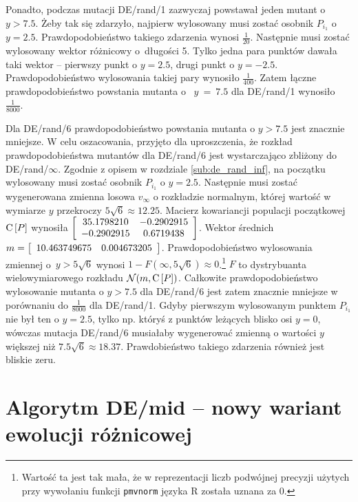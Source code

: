 \documentclass[a4paper,onecolumn,oneside,12pt,wide,floatssmall]{mwrep}
\def\C{{\rm C}\,}
\theoremstyle{definition}
\theoremstyle{plain}%
\theoremstyle{remark}
\begin{document}
Ponadto, podczas mutacji DE/rand/1 zazwyczaj powstawał jeden mutant o $y > 7.5$. 
Żeby tak się zdarzyło, najpierw wylosowany musi zostać osobnik $P_{i_1}$ o~$y=2.5$.
Prawdopodobieństwo takiego zdarzenia wynosi $\frac{1}{20}$.
Następnie musi zostać wylosowany wektor różnicowy o~długości 5. Tylko jedna para punktów 
dawała taki wektor --
pierwszy punkt o $y = 2.5$, drugi punkt o $y = -2.5$. 
Prawdopodobieństwo wylosowania takiej pary wynosiło $\frac{1}{400}$. 
Zatem łączne prawdopodobieństwo powstania mutanta o~
$y~=~7.5$ dla DE/rand/1 wynosiło $\frac{1}{8000}$. 

Dla DE/rand/6 prawdopodobieństwo powstania mutanta o $y > 7.5$ jest znacznie mniejsze.
W celu oszacowania, przyjęto dla uproszczenia, że rozkład prawdopodobieństwa mutantów dla
DE/rand/6 jest wystarczająco zbliżony do DE/rand/$\infty$.
Zgodnie z opisem w rozdziale \ref{sub:de_rand_inf}, na początku wylosowany musi zostać osobnik 
$P_{i_1}$ o $y = 2.5$. Następnie musi zostać wygenerowana zmienna losowa 
$v_\infty$ o rozkładzie normalnym, której wartość w wymiarze $y$
przekroczy $5\sqrt{6} \approx 12.25$. Macierz kowariancji populacji początkowej  
$\C[P]$ wynosiła $\left[ \begin{array}{ c c }
  35.1798210 & -0.2902915 \\
  -0.2902915 &  0.6719438
\end{array} \right]$.
Wektor średnich~$m=\left[ \begin{array}{ c c } 10.463749675 & 0.004673205 \end{array} \right]$.
Prawdopodobieństwo wylosowania zmiennej o~$y > 5\sqrt{6}$ wynosi 
$1 - F(\infty, 5\sqrt{6}) \approx 0$.\footnote{Wartość ta jest tak mała,
że w reprezentacji liczb podwójnej precyzji użytych przy wywołaniu funkcji \texttt{pmvnorm} języka R
została uznana za 0.} $F$ to
dystrybuanta wielowymiarowego rozkładu $\mathcal{N}(m, \C[P])$.
Całkowite prawdopodobieństwo wylosowanie mutanta o $y > 7.5$ dla DE/rand/6 jest zatem 
znacznie mniejsze w porównaniu do
$\frac{1}{8000}$ dla DE/rand/1.
Gdyby pierwszym wylosowanym punktem $P_{i_1}$ nie był ten o $y = 2.5$, tylko np. któryś 
z punktów leżących blisko osi $y = 0$, wówczas mutacja DE/rand/6 musiałaby wygenerować zmienną
o wartości $y$ większej niż $7.5\sqrt{6} \approx 18.37$. 
Prawdobieństwo takiego zdarzenia również jest bliskie zeru.

\section{Algorytm DE/mid -- nowy wariant ewolucji różnicowej}
\label{chap:de_mid}
\end{document}

